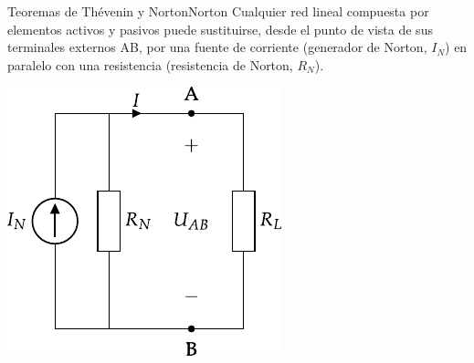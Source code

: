 \documentclass[aspectratio=169, xcolor={usenames,svgnames,dvipsnames}]{beamer}
\begin{document}
\begin{frame}{Teoremas de Thévenin y Norton}{Norton}
Cualquier \alert{red lineal} compuesta por elementos activos y pasivos puede sustituirse, desde el punto de vista de sus terminales externos AB, por una \alert{fuente de corriente} (generador de Norton, \(I_N\)) en \alert{paralelo} con una resistencia (resistencia de Norton, \(R_N\)).

\begin{center}
\includegraphics[width=.37\linewidth]{../figs/norton_continua.pdf}
\end{center}
\end{frame}
\end{document}
